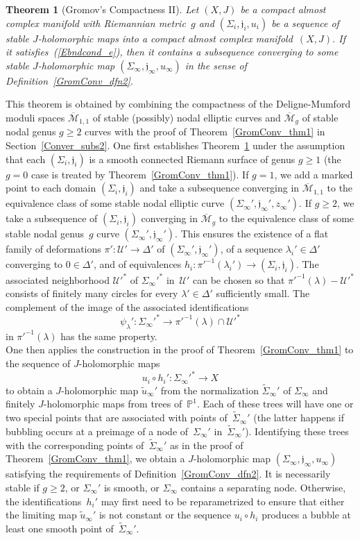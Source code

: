 \documentclass[11pt]{article}
\numberwithin{equation}{section}
\newtheorem{thm}{Theorem}[section]
\theoremstyle{definition}
\def\eref#1{(\ref{#1})}
\def\ov#1{\overline{#1}}
\def\wt#1{\widetilde{#1}}
\def\lra{\longrightarrow}
\def\fj{\mathfrak j}
\def\cM{\mathcal M}
\def\P{\mathbb{P}}
\def\cU{\mathcal U}
\def\la{\lambda}
\def\De{\Delta}
\def\Si{\Sigma}
\def\i{\infty}
\begin{document}
\begin{thm}[Gromov's Compactness II]\label{GromConv_thm2}
Let $(X,J)$ be a compact almost complex manifold with Riemannian metric~$g$
and $(\Si_i,\fj_i,u_i)$ be a sequence of stable $J$-holomorphic maps 
into a compact almost complex manifold~$(X,J)$.
If it satisfies~\eref{Ebndcond_e},
then it contains a subsequence 
converging to some stable $J$-holomorphic map $(\Si_{\i},\fj_{\i},u_{\i})$
in the sense of Definition~\ref{GromConv_dfn2}.
\end{thm}

\noindent
This theorem is obtained by combining the compactness of the Deligne-Mumford moduli spaces
$\ov\cM_{1,1}$ of stable (possibly) nodal elliptic curves and $\ov\cM_g$ of stable nodal genus 
$g\!\ge\!2$ curves with the proof of Theorem~\ref{GromConv_thm1} in Section~\ref{Conver_subs2}.
One first establishes Theorem~\ref{GromConv_thm2} under the assumption that 
each $(\Si_i,\fj_i)$ is a smooth connected Riemann surface of genus $g\!\ge\!1$
(the $g\!=\!0$ case is treated by Theorem~\ref{GromConv_thm1}).
If $g\!=\!1$, we add a marked point to each domain $(\Si_i,\fj_i)$ and take 
a subsequence converging in $\ov\cM_{1,1}$ to the equivalence class
of some stable nodal elliptic curve $(\Si_{\i}',\fj_{\i}',z_{\i}')$.
If $g\!\ge\!2$, we take a subsequence of $(\Si_i,\fj_i)$ converging in $\ov\cM_g$
to the equivalence class
of some stable nodal genus~$g$  curve $(\Si_{\i}',\fj_{\i}')$.
This ensures the existence of a flat family of deformations 
$\pi'\!:\cU'\!\lra\!\De'$ of $(\Si_{\i}',\fj_{\i}')$,
of a sequence $\la_i'\!\in\!\De'$ converging to $0\!\in\!\De'$, and
of equivalences $h_i\!:\pi'^{-1}(\la_i')\!\lra\!(\Si_i,\fj_i)$.
The associated neighborhood $\cU'^*$ of $\Si_{\i}'^*$ in~$\cU'$ can be chosen
so that $\pi'^{-1}(\la)\!-\!\cU'^*$ consists of finitely many circles
for every $\la'\!\in\!\De'$ sufficiently small.
The complement of the image of the associated identifications
$$\psi_{\la}'\!:\Si_{\i}'^*\lra \pi'^{-1}(\la)\!\cap\!\cU'^*$$
in $\pi'^{-1}(\la)$ has the same property.\\

\noindent
One then applies the construction in the proof of Theorem~\ref{GromConv_thm1}
to the sequence of
$J$-holomorphic maps 
$$u_i\!\circ\!h_i'\!:\Si_{\i}'^*\lra X$$
to obtain a $J$-holomorphic map $\wt{u}_{\i}'$ from the normalization 
$\wt\Si_{\i}'$ of $\Si_{\i}$ and finitely $J$-holomorphic maps from
trees of~$\P^1$. 
Each of these trees will have one or two special points that are associated 
with points of~$\wt\Si_{\i}'$ (the latter happens if bubbling occurs at
a preimage of a node of~$\Si_{\i}'$ in~$\wt\Si_{\i}'$). 
Identifying these trees with the corresponding points of~$\wt\Si_{\i}'$ as 
in the proof of Theorem~\ref{GromConv_thm1}, 
we obtain a $J$-holomorphic map $(\Si_{\i},\fj_{\i},u_{\i})$
satisfying the requirements of Definition~\ref{GromConv_dfn2}.
It is necessarily stable if $g\!\ge\!2$, or $\Si_{\i}'$ is smooth, or
$\Si_{\i}$ contains a separating node.
Otherwise, the identifications~$h_i'$ may first need to be reparametrized to ensure
that either the limiting map $\wt{u}_{\i}'$ is not constant or the sequence
$u_i\!\circ\!h_i$ produces a bubble at least one smooth point of~$\wt\Si_{\i}'$.\\
\end{document}
